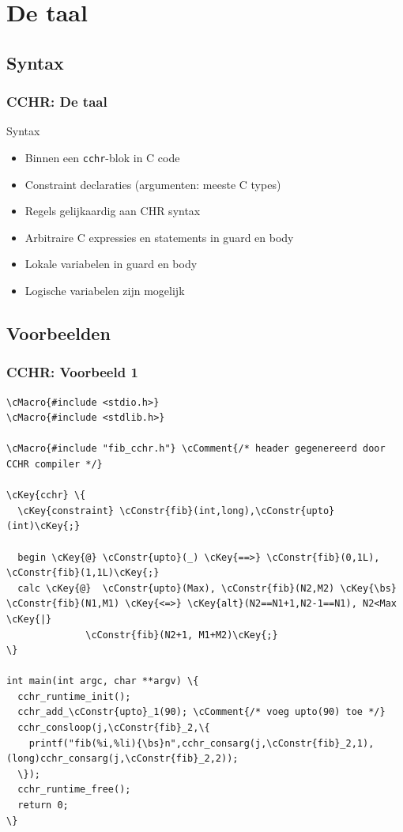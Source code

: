 \documentclass{beamer}
\newcommand{\bs}{$\backslash$}
\newcommand{\cConstr}[1]{\textcolor{blue}{#1}}
\newcommand{\cMacro}[1]{\textcolor{dred}{#1}}
\newcommand{\cComment}[1]{\textcolor{dgreen}{#1}}
\newcommand{\cKey}[1]{\textcolor{red}{#1}}
\newcommand{\code}[1]{{\tt #1}}
\begin{document}
\section{De taal}

\subsection{Syntax}

\begin{frame}
  \frametitle{CCHR: De taal}
  \begin{block}{Syntax}
    \begin{itemize}
      \item Binnen een \code{cchr}-blok in C code
      \item Constraint declaraties (argumenten: meeste C types)
      \item Regels gelijkaardig aan CHR syntax
      \item Arbitraire C expressies en statements in guard en body
      \item Lokale variabelen in guard en body
      \item Logische variabelen zijn mogelijk
    \end{itemize}
  \end{block}
\end{frame}

\subsection{Voorbeelden}

\begin{frame}[containsverbatim]
  \frametitle{CCHR: Voorbeeld 1}
  \begin{example}[Voorbeeld 1]{\tiny
\begin{Verbatim}[commandchars=\\\{\}]
\cMacro{#include <stdio.h>}
\cMacro{#include <stdlib.h>}

\cMacro{#include "fib_cchr.h"} \cComment{/* header gegenereerd door CCHR compiler */}

\cKey{cchr} \{
  \cKey{constraint} \cConstr{fib}(int,long),\cConstr{upto}(int)\cKey{;}

  begin \cKey{@} \cConstr{upto}(_) \cKey{==>} \cConstr{fib}(0,1L), \cConstr{fib}(1,1L)\cKey{;}
  calc \cKey{@}  \cConstr{upto}(Max), \cConstr{fib}(N2,M2) \cKey{\bs} \cConstr{fib}(N1,M1) \cKey{<=>} \cKey{alt}(N2==N1+1,N2-1==N1), N2<Max \cKey{|}
              \cConstr{fib}(N2+1, M1+M2)\cKey{;}
\}

int main(int argc, char **argv) \{
  cchr_runtime_init();
  cchr_add_\cConstr{upto}_1(90); \cComment{/* voeg upto(90) toe */}
  cchr_consloop(j,\cConstr{fib}_2,\{
    printf("fib(%i,%li){\bs}n",cchr_consarg(j,\cConstr{fib}_2,1),(long)cchr_consarg(j,\cConstr{fib}_2,2));
  \});
  cchr_runtime_free();
  return 0;
\}
\end{Verbatim}
}  \end{example}
\end{frame}
\end{document}
